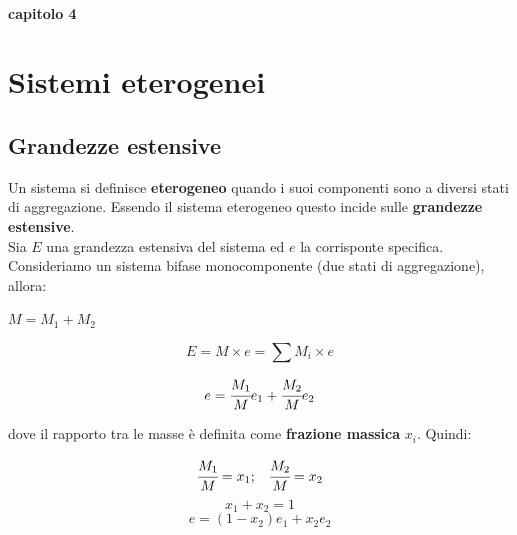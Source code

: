 \documentclass[a4paper,12pt,titlepage]{article}
\begin{document}
\paragraph{capitolo 4}
\section{Sistemi eterogenei}
\subsection{Grandezze estensive}
Un sistema si definisce \textbf{eterogeneo} quando i suoi componenti sono a diversi stati di aggregazione.
Essendo il sistema eterogeneo questo incide sulle \textbf{grandezze estensive}. \\
Sia $E$ una grandezza estensiva del sistema ed $e$ la corrisponte specifica. Consideriamo un sistema bifase monocomponente (due stati di aggregazione), allora:
\begin{center}
$M = M_{1}+M_{2}$ 


$$E = M \times e = \sum{M_{i}} \times e $$ 

$$e = \cfrac{M_{1}}{M}e_{1} + \cfrac{M_{2}}{M}e_{2}$$
\end{center}
dove il rapporto tra le masse è definita come \textbf{frazione massica} $x_{i}$.
Quindi:
\begin{center}
$$ \cfrac{M_{1}}{M} = x_{1}; \;\;\; \cfrac{M_{2}}{M} = x_{2} $$
$$ x_{1} + x_{2} = 1$$
$$ e = (1-x_{2})e_{1} + x_{2}e_{2}$$
\end{center}

\clearpage
\end{document}
